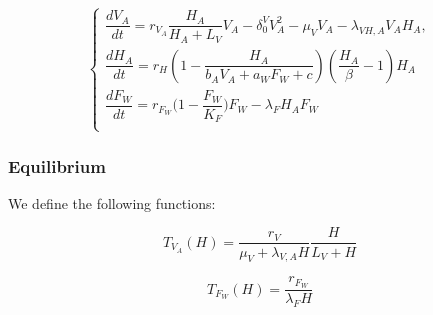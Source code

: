 \documentclass{article}
\newcommand{\lva}{\lambda_{V, A}}
\newcommand{\lfw}{\lambda_{F}}
\begin{document}
\begin{equation}
\left\{ \begin{array}{l}
\dfrac{dV_{A}}{dt}=r_{V_A}  \dfrac{H_A}{H_A+L_V}V_A - \delta_0^V V_A^2-\mu_{V}V_A-\lambda_{VH,A}V_AH_A,\\
\dfrac{dH_A}{dt}=r_{H}\left(1-\dfrac{H_A}{b_A V_A + a_W F_W + c}\right)\left(\dfrac{H_A}{\beta}-1\right)H_A  \\
\dfrac{dF_W}{dt} = r_{F_W} \Big(1 - \dfrac{F_W}{K_F}\Big) F_W - \lfw H_A F_W\\
\end{array}\right.
\label{anthropicWild:VW=KV:VAHAFW}
\end{equation}

\subsubsection{Equilibrium}
We define the following functions:

\begin{equation*}
T_{V_A}(H) = \dfrac{r_V}{\mu_V + \lva H} \dfrac{H}{L_V + H}
\end{equation*}

$$
T_{F_W}(H) = \dfrac{r_{F_W}}{\lfw H}
$$
\end{document}
